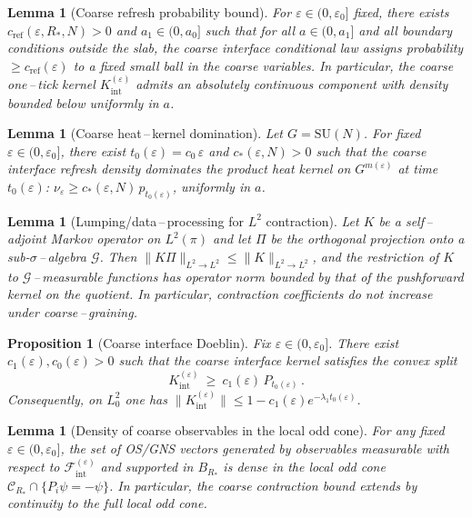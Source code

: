 \documentclass[11pt]{amsart}
\theoremstyle{plain}
\newtheorem{lemma}[theorem]{Lemma}
\newtheorem{proposition}[theorem]{Proposition}
\theoremstyle{definition}
\theoremstyle{remark}
\begin{document}
\begin{lemma}[Coarse refresh probability bound]\label{lem:coarse-refresh}
For $\varepsilon\in(0,\varepsilon_0]$ fixed, there exists $c_{\mathrm{ref}}(\varepsilon,R_*,N)>0$ and $a_1\in(0,a_0]$ such that for all $a\in(0,a_1]$ and all boundary conditions outside the slab, the coarse interface conditional law assigns probability $\ge c_{\mathrm{ref}}(\varepsilon)$ to a fixed small ball in the coarse variables. In particular, the coarse one\,–\,tick kernel $K_{\mathrm{int}}^{(\varepsilon)}$ admits an absolutely continuous component with density bounded below uniformly in $a$.
\end{lemma}

\begin{lemma}[Coarse heat\,–\,kernel domination]\label{lem:coarse-hk-domination}
Let $G=\mathrm{SU}(N)$. For fixed $\varepsilon\in(0,\varepsilon_0]$, there exist $t_0(\varepsilon)=c_0\,\varepsilon$ and $c_*(\varepsilon,N)>0$ such that the coarse interface refresh density dominates the product heat kernel on $G^{m(\varepsilon)}$ at time $t_0(\varepsilon)$: $\nu_{\varepsilon}\ge c_*(\varepsilon,N)\, p_{t_0(\varepsilon)}$, uniformly in $a$.
\end{lemma}

\begin{lemma}[Lumping/data\,–\,processing for $L^2$ contraction]\label{lem:lumping}
Let $K$ be a self\,–\,adjoint Markov operator on $L^2(\pi)$ and let $\Pi$ be the orthogonal projection onto a sub-$\sigma$\,–\,algebra $\mathcal G$. Then $\| K\Pi\|_{L^2\to L^2} \le \|K\|_{L^2\to L^2}$, and the restriction of $K$ to $\mathcal G$\,–\,measurable functions has operator norm bounded by that of the pushforward kernel on the quotient. In particular, contraction coefficients do not increase under coarse\,–\,graining.
\end{lemma}

\begin{proposition}[Coarse interface Doeblin]\label{prop:coarse-doeblin}
Fix $\varepsilon\in(0,\varepsilon_0]$. There exist $c_1(\varepsilon),c_0(\varepsilon)>0$ such that the coarse interface kernel satisfies the convex split
\[
  K_{\mathrm{int}}^{(\varepsilon)}\ \ge\ c_1(\varepsilon)\, P_{t_0(\varepsilon)}\,.
\]
Consequently, on $L_0^2$ one has $\|K_{\mathrm{int}}^{(\varepsilon)}\|\le 1- c_1(\varepsilon) e^{-\lambda_1 t_0(\varepsilon)}$.
\end{proposition}

\begin{lemma}[Density of coarse observables in the local odd cone]\label{lem:coarse-density}
For any fixed $\varepsilon\in(0,\varepsilon_0]$, the set of OS/GNS vectors generated by observables measurable with respect to $\mathcal F_{\mathrm{int}}^{(\varepsilon)}$ and supported in $B_{R_*}$ is dense in the local odd cone $\mathcal C_{R_*}\cap\{P_i\psi=-\psi\}$. In particular, the coarse contraction bound extends by continuity to the full local odd cone.
\end{lemma}
\end{document}
